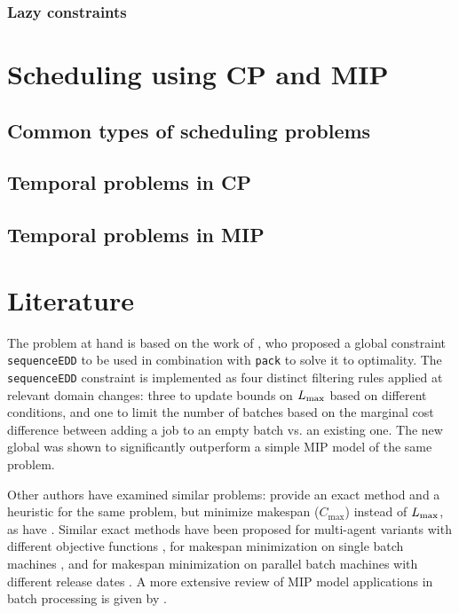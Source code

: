 \documentclass[13pt, letterpaper, oneside]{book}
\begin{document}
\subsubsection{Lazy constraints}

\section{Scheduling using CP and MIP}
\subsection{Common types of scheduling problems}
\subsection{Temporal problems in CP}
\subsection{Temporal problems in MIP}

\section{Literature}
The problem at hand is based on the work of \citet{Malapert}, who proposed a global
constraint \texttt{sequenceEDD} to be used in combination with \texttt{pack} to
solve it to optimality. The \texttt{sequenceEDD} constraint is implemented as
four distinct filtering rules applied at relevant domain changes: three to update
bounds on $L_{\text{max}}$ based on different conditions, and one to limit the number of
batches based on the marginal cost difference between adding a job to an empty batch vs. an
existing one. The new global was shown to significantly outperform a simple MIP model of the same problem.

Other authors have examined similar problems: \citet{Azizoglu} provide an exact
method and a heuristic for the same problem, but minimize makespan
($C_\text{max}$) instead of $L_{\text{max}}$, as have \cite{Dupont}. Similar exact
methods have been proposed for multi-agent variants with different objective
functions \citep{Sabouni}, for makespan minimization on single batch machines
\citep{Kashan}, and for makespan minimization on parallel batch machines with
different release dates \citep{Ozturk}. A more extensive review of MIP model
applications in batch processing is given by \citet{Grossmann}.

\end{document}
